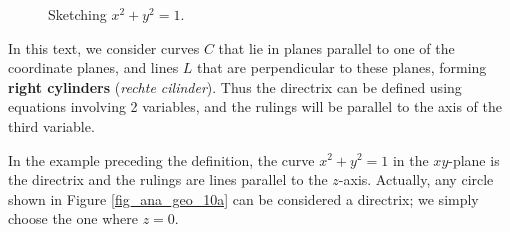 \begin{figure}[H]
\centering
\centerline{
\hspace{0.1cm}
}
\caption{Sketching $x^2+y^2=1$. }
\end{figure}


In this text, we consider curves $C$ that lie in planes parallel to one of the coordinate planes, and lines $L$ that are perpendicular to these planes, forming \textbf{right cylinders} (\textit{rechte cilinder}). Thus the directrix can be defined using equations involving 2 variables, and the rulings will be parallel to the axis of the third variable.

In the example preceding the definition, the curve $x^2+y^2=1$ in the $xy$-plane is the directrix and the rulings are lines parallel to the $z$-axis. Actually, any circle shown in Figure \ref{fig_ana_geo_10a} can be considered a directrix; we simply choose the one where $z=0$. 


